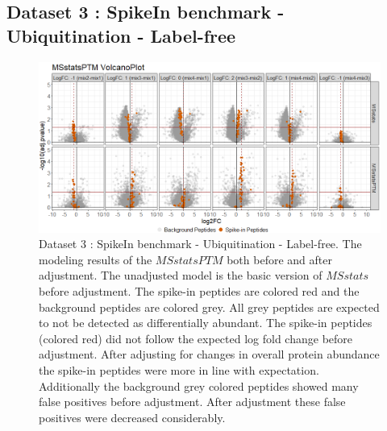 \documentclass{mcp}
\begin{document}
\clearpage
\subsection{Dataset 3 : SpikeIn benchmark - Ubiquitination - Label-free}
\label{sec:benchmark}

\begin{figure}[h!]
\centering
\includegraphics[width=1\textwidth]{sim_new/SuppFigure3.png}
\caption{Dataset 3 : SpikeIn benchmark - Ubiquitination - Label-free. The modeling results of the $MSstatsPTM$ both before and after adjustment. The unadjusted model is the basic version of $MSstats$ before adjustment. The spike-in peptides are colored red and the background peptides are colored grey. All grey peptides are expected to not be detected as differentially abundant. The spike-in peptides (colored red) did not follow the expected log fold change before adjustment. After adjusting for changes in overall protein abundance the spike-in peptides were more in line with expectation. Additionally the background grey colored peptides showed many false positives before adjustment. After adjustment these false positives were decreased considerably. \label{fig:spike_volcano_msstats}}
\end{figure}
\end{document}

